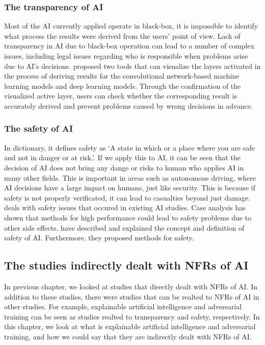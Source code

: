 \documentclass[journal,article,submit,moreauthors,pdftex]{Definitions/mdpi}
\begin{document}
\subsubsection{The transparency of AI}

Most of the AI currently applied operate in black-box, it is impossible to identify what process the results were derived from the users' point of view.
Lack of transparency in AI due to black-box operation can lead to a number of complex issues, including legal issues regarding who is responsible when problems arise due to AI's decisions.
\cite{transparency-yosinski} proposed two tools that can visualize the layers activated in the process of deriving results for the convolutional network-based machine learning models and deep learning models.
Through the confirmation of the visualized active layer, users can check whether the corresponding result is accurately derived and prevent problems caused by wrong decisions in advance.

\subsubsection{The safety of AI}

In dictionary, it defines safety as `A state in which or a place where you are safe and not in danger or at risk.'.
If we apply this to AI, it can be seen that the decision of AI does not bring any dange or risks to human who applies AI in many other fields.
This is important in areas such as autonomous driving, where AI decisions have a large impact on humans, just like security.
This is because if safety is not properly verificated, it can lead to casualties beyond just damage.
\cite{safety-amodei} deals with safety issues that occured in existing AI studies.
Case analysis has shown that methods for high performance could lead to safety problems due to other side effects.
\cite{safety-juric,safety-leike} have described and explained the concept and definition of safety of AI. Furthermore, they proposed methods for safety.

\subsection{The studies indirectly dealt with NFRs of AI}

In previous chapter, we looked at studies that directly dealt with NFRs of AI.
In addition to these studies, there were studies that can be realted to NFRs of AI in other studies.
For example, explainable artificial intelligence and adversarial training can be seen as studies realted to transparency and safety, respectively.
In this chapter, we look at what is explainable artificial intelligence and adversarial training, and how we could say that they are indirectly dealt with NFRs of AI.
\end{document}
